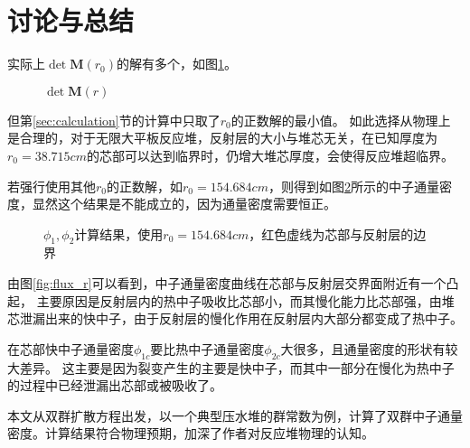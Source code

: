 \section{讨论与总结}
\label{sec:discussion}

实际上$\det \pmb{M}(r_0)$的解有多个，如图\ref{fig:det_M_r_far}。

\begin{figure}[H]
    \centering
    
    \caption{$\det \pmb{M}(r)$}
    \label{fig:det_M_r_far}
\end{figure}

但第\ref{sec:calculation}节的计算中只取了$r_0$的正数解的最小值。
如此选择从物理上是合理的，对于无限大平板反应堆，反射层的大小与堆芯无关，在已知厚度为$r_0=38.715\si{cm}$的芯部可以达到临界时，仍增大堆芯厚度，会使得反应堆超临界。

若强行使用其他$r_0$的正数解，如$r_0=154.684\si{cm}$，则得到如图\ref{fig:flux_r_far}所示的中子通量密度，显然这个结果是不能成立的，因为通量密度需要恒正。

\begin{figure}[H]
    \centering
    
    \caption{$\phi_1,\phi_2$计算结果，使用$r_0=154.684\si{cm}$，红色虚线为芯部与反射层的边界}
    \label{fig:flux_r_far}
\end{figure}

由图\ref{fig:flux_r}可以看到，中子通量密度曲线在芯部与反射层交界面附近有一个凸起，
主要原因是反射层内的热中子吸收比芯部小，而其慢化能力比芯部强，由堆芯泄漏出来的快中子，由于反射层的慢化作用在反射层内大部分都变成了热中子。

在芯部快中子通量密度$\phi_{1c}$要比热中子通量密度$\phi_{2c}$大很多，且通量密度的形状有较大差异。
这主要是因为裂变产生的主要是快中子，而其中一部分在慢化为热中子的过程中已经泄漏出芯部或被吸收了。

本文从双群扩散方程出发，以一个典型压水堆的群常数为例，计算了双群中子通量密度。计算结果符合物理预期，加深了作者对反应堆物理的认知。
